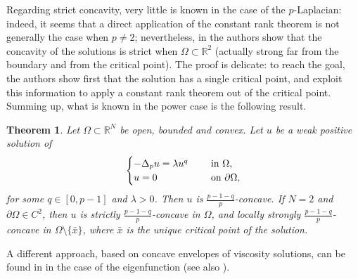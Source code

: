 \documentclass[11pt, reqno]{amsart}
\newtheorem{theorem}[lemma]{Theorem}
\theoremstyle{definition}
\numberwithin{equation}{section}
\newcommand{\R}{\mathbb{R}}
\begin{document}
Regarding strict concavity, very little is known in the case of the $p$-Laplacian: indeed, it seems that a direct application of the constant rank theorem is not generally the case when $p\neq 2$; nevertheless, in \cite{BMS23} the authors show that the concavity of the solutions is strict when $\Omega \subset \R^2$ (actually strong far from the boundary and from the critical point). 
The proof is delicate: to reach the goal, the authors show first that the solution has a single critical point, and exploit this information to apply a constant rank theorem out of the critical point.
Summing up, what is known \cite{Sak87, BMS22, BMS23} in the power case is the following result.
\begin{theorem}
\label{thm_intr_recap_plaplac}
Let $\Omega \subset\R^N$ be open, bounded and convex. Let $u$ be a weak positive solution of
 $$ \begin{cases}
-\Delta_p u = \lambda u^q & \quad \hbox{ in $\Omega$},\\ 
u =0 & \quad \hbox{ on $\partial \Omega$},
\end{cases}$$
for some $q \in [0,p-1]$ and $\lambda>0$. 
Then $u$ is $\frac{p-1-q}{p}$-concave. 
If $N=2$ and $\partial \Omega \in C^2$, then $u$ is strictly $\frac{p-1-q}{p}$-concave in $\Omega$, and locally strongly $\frac{p-1-q}{p}$-concave in $\Omega\setminus\{\bar{x}\}$, where $\bar{x}$ is the unique critical point of the solution.
\end{theorem} 
A different approach, based on concave envelopes of viscosity solutions, can be found in \cite{CrFr20} in the case of the eigenfunction (see also \cite{ALL97}). 
\end{document}
